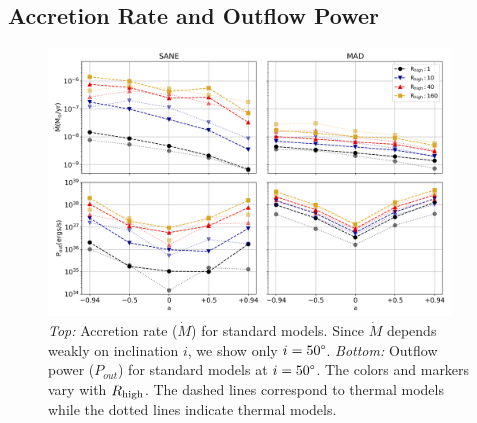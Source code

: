 

\subsection{Accretion Rate and Outflow Power}



\begin{figure}
  \centering
  \includegraphics[width=0.95\textwidth]{figures/bhac_kharma_average_mdot_pout.png}
  \caption{{\it Top:} Accretion rate ($\dot{M}$) for standard models. Since $\dot{M}$ depends weakly on inclination $i$, we show only $i=50\degree$. {\it Bottom:} Outflow power ($P_{out}$) for standard models at $i = 50\degree$. The colors and markers vary with $R_\mathrm{high}$. The dashed lines correspond to \kharma thermal models while the dotted lines indicate \bhac thermal models.}
  \label{fig:accretion_outflow_power_illinois_thermal}
\end{figure}


